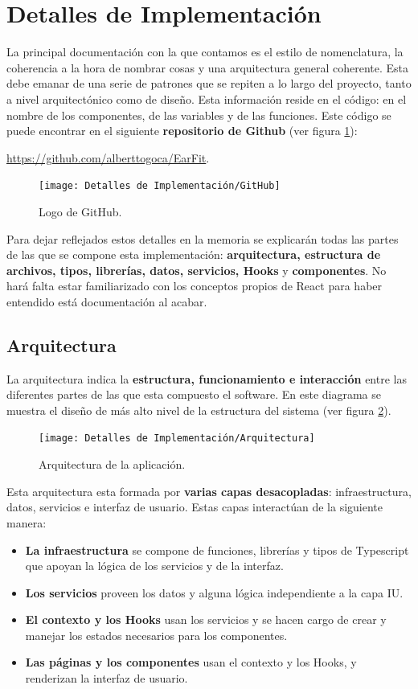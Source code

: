 \documentclass[12pt,twoside,titlepage]{report}
\begin{document}
\section{Detalles de Implementación}
La principal documentación con la que contamos es el estilo de nomenclatura, la coherencia a la hora de nombrar cosas y una arquitectura general coherente. Esta debe emanar de una serie de patrones que se repiten a lo largo del proyecto, tanto a nivel arquitectónico como de diseño. Esta información reside en el código: en el nombre de los componentes, de las variables y de las funciones. Este código se puede encontrar en el siguiente \textbf{repositorio de Github} (ver figura \ref{fig:GitHubLogo}):

\url{https://github.com/alberttogoca/EarFit}.

\begin{figure}[H]
    \centering
    \texttt{[image: Detalles de Implementación/GitHub]}
    \caption{Logo de GitHub.}
    \label{fig:GitHubLogo}
\end{figure}

Para dejar reflejados estos detalles en la memoria se explicarán todas las partes de las que se compone esta implementación: \textbf{arquitectura, estructura de archivos, tipos, librerías, datos, servicios, Hooks} y \textbf{componentes}. No hará falta estar familiarizado con los conceptos propios de React para haber entendido está documentación al acabar.

\subsection{Arquitectura}

La arquitectura indica la \textbf{estructura, funcionamiento e interacción} entre las diferentes partes de las que esta compuesto el software. En este diagrama se muestra el diseño de más alto nivel de la estructura del sistema (ver figura \ref{fig:Arquitectura}).

\begin{figure}[H]
    \centering
    \texttt{[image: Detalles de Implementación/Arquitectura]}
    \caption{Arquitectura de la aplicación.}
    \label{fig:Arquitectura}
\end{figure}

Esta arquitectura esta formada por \textbf{varias capas desacopladas}: infraestructura, datos, servicios e interfaz de usuario. Estas capas interactúan de la siguiente manera:

\begin{itemize}
    \item \textbf{La infraestructura} se compone de funciones, librerías y tipos de Typescript que apoyan la lógica de los servicios y de la interfaz.
    \item \textbf{Los servicios} proveen los datos y alguna lógica independiente a la capa IU.
    \item \textbf{El contexto y los Hooks} usan los servicios y se hacen cargo de crear y manejar los estados necesarios para los componentes.
    \item \textbf{Las páginas y los componentes} usan el contexto y los Hooks, y renderizan la interfaz de usuario.
\end{itemize}
\end{document}
